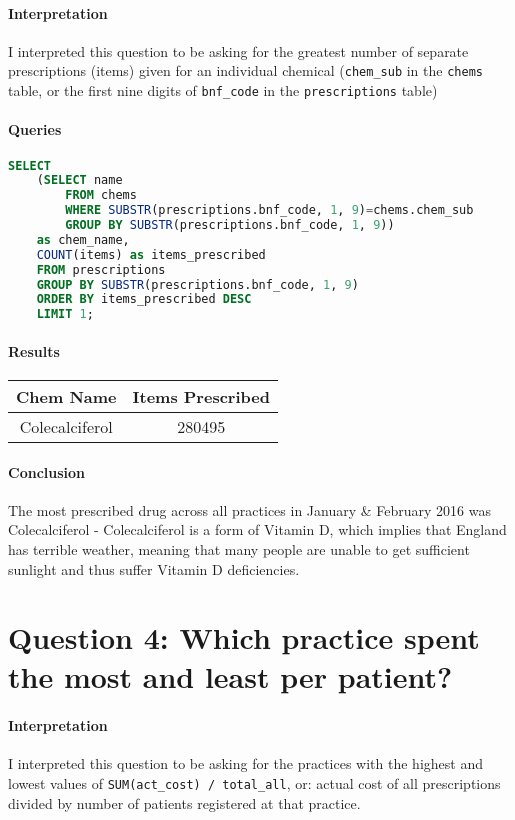 \documentclass{report}
\begin{document}
\paragraph{Interpretation}
I interpreted this question to be asking for the greatest number of separate prescriptions (items) given for an individual chemical (\texttt{chem\_sub} in the \texttt{chems} table, or the first nine digits of \texttt{bnf\_code} in the \texttt{prescriptions} table)
\paragraph{Queries}
\begin{lstlisting}[language=SQL, caption=Question 3 query]
SELECT 
    (SELECT name 
        FROM chems 
        WHERE SUBSTR(prescriptions.bnf_code, 1, 9)=chems.chem_sub 
        GROUP BY SUBSTR(prescriptions.bnf_code, 1, 9)) 
    as chem_name, 
    COUNT(items) as items_prescribed 
    FROM prescriptions 
    GROUP BY SUBSTR(prescriptions.bnf_code, 1, 9) 
    ORDER BY items_prescribed DESC 
    LIMIT 1;
\end{lstlisting}
\paragraph{Results}
\begin{center}
\begin{tabular}{ | c | c | }
\hline
Chem Name & Items Prescribed \\
\hline
Colecalciferol & 280495 \\
\hline
\end{tabular}
\end{center}
\paragraph{Conclusion}
The most prescribed drug across all practices in January \& February 2016 was Colecalciferol - Colecalciferol is a form of Vitamin D, which implies that England has terrible weather, meaning that many people are unable to get sufficient sunlight and thus suffer Vitamin D deficiencies.

\section{Question 4: Which practice spent the most and least per patient?}
\paragraph{Interpretation}
I interpreted this question to be asking for the practices with the highest and lowest values of \texttt{SUM(act\_cost) / total\_all}, or: actual cost of all prescriptions divided by number of patients registered at that practice.
\end{document}
